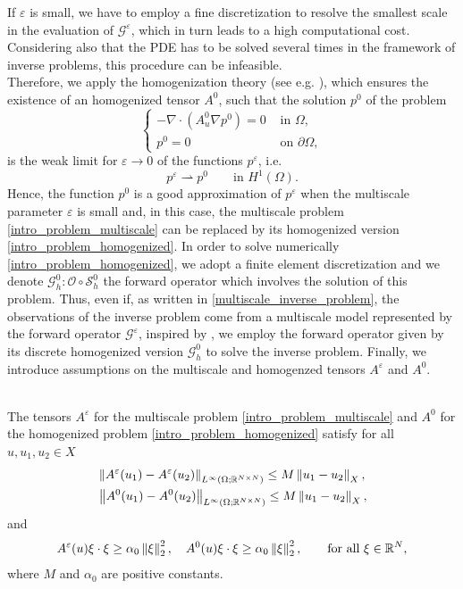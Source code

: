 \documentclass[10pt]{article}
\begin{document}
If $\varepsilon$ is small, we have to employ a fine discretization to resolve the smallest scale in the evaluation of $\mathcal{G}^{\varepsilon}$, which in turn leads to a high computational cost. Considering also that the PDE has to be solved several times in the framework of inverse problems, this procedure can be infeasible. \\
Therefore, we apply the homogenization theory (see e.g. \cite{CiD99}), which ensures the existence of an homogenized tensor $A^0$, such that the solution $p^0$ of the problem 
\begin{equation}
\label{intro_problem_homogenized}
\begin{cases}
- \nabla \cdot ( A^0_u \nabla p^0 ) = 0 & \text{ in } \Omega, \\
p^0 = 0 & \text{ on } \partial \Omega,
\end{cases}
\end{equation}
is the weak limit for $\varepsilon \to 0$ of the functions $p^{\varepsilon}$, i.e.
\begin{equation*}
p^{\varepsilon} \rightharpoonup p^0 \qquad \text{in } H^1(\Omega).
\end{equation*}
Hence, the function $p^0$ is a good approximation of $p^{\varepsilon}$ when the multiscale parameter $\varepsilon$ is
small and, in this case, the multiscale problem \eqref{intro_problem_multiscale} can be replaced by its homogenized version \eqref{intro_problem_homogenized}. In order to solve numerically \eqref{intro_problem_homogenized}, we adopt a finite element discretization and we denote $\mathcal{G}^0_h \colon \mathcal{O} \circ \mathcal{S}^0_h$ the forward operator which involves the solution of this problem. Thus, even if, as written in \eqref{multiscale_inverse_problem}, the observations of the inverse problem come from a multiscale model represented by the forward operator $\mathcal{G}^{\varepsilon}$, inspired by \cite{NPS12}, we employ the forward operator given by its discrete homogenized version $\mathcal{G}^0_h$ to solve the inverse problem. Finally, we introduce assumptions on the multiscale and homogenzed tensors $A^{\varepsilon}$ and $A^0$.
\begin{assumption}
\label{ass_A}
\leavevmode \\
The tensors $A^{\varepsilon}$ for the multiscale problem \eqref{intro_problem_multiscale} and $A^0$ for the homogenized problem \eqref{intro_problem_homogenized} satisfy for all $u, u_1, u_2 \in X$
\begin{align*}
& \left\|A^{\varepsilon}(u_1) - A^{\varepsilon}(u_2)\right\|_{L^{\infty}(\Omega;\mathbb{R}^{N \times N})} \le M \left\|u_1 - u_2\right\|_X, \\
& \left\|A^0(u_1) - A^0(u_2)\right\|_{L^{\infty}(\Omega;\mathbb{R}^{N \times N})} \le M \left\|u_1 - u_2\right\|_X,
\end{align*}
and
\begin{equation*}
A^{\varepsilon}(u) \xi \cdot \xi \ge \alpha_0 \left\|\xi\right\|_2^2, \quad A^0(u) \xi \cdot \xi \ge \alpha_0 \left\|\xi\right\|_2^2, \qquad \text{for all } \xi \in \mathbb{R}^N,
\end{equation*}
where $M$ and $\alpha_0$ are positive constants.
\end{assumption}
\end{document}
